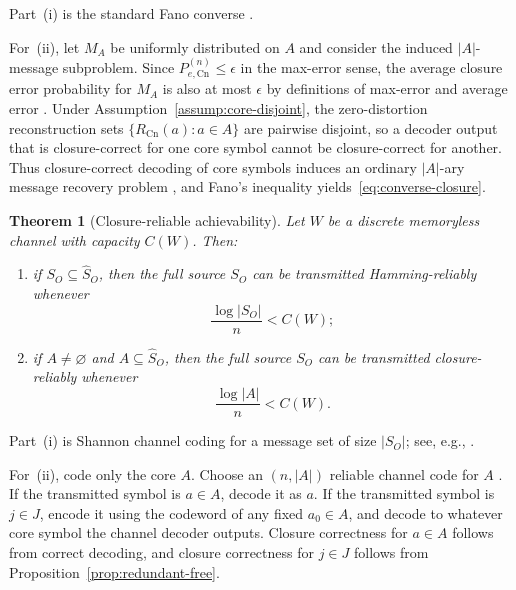 \documentclass[journal,onecolumn]{IEEEtran}
\makeatletter
\newcommand{\Cn}{\text{Cn}}
\newtheorem{theorem}{Theorem}[section]
\numberwithin{equation}{section}
\renewenvironment{proof}[1][\proofname]{\par
  \pushQED{\qed}%
  \normalfont \topsep6\p@\@plus6\p@\relax
  \trivlist
  \item[\hskip\labelsep
        \itshape
    #1\@addpunct{.}]\ignorespaces
}{%
  \popQED\endtrivlist\@endpefalse
}
\makeatother
\begin{document}
\begin{proof}
Part~\textup{(i)} is the standard Fano converse
\cite[Ch.~2]{cover2006elements}\cite[Ch.~3]{csiszar2011information}.

For~\textup{(ii)}, let \(M_A\) be uniformly distributed on \(A\) and
consider the induced \(|A|\)-message subproblem. Since
\(P_{e,\Cn}^{(n)}\le\epsilon\) in the max-error sense, the average
closure error probability for \(M_A\) is also at most \(\epsilon\)
by definitions of max-error and average error
\cite[Ch.~7]{cover2006elements}\cite[Ch.~6]{csiszar2011information}.
Under Assumption~\ref{assump:core-disjoint}, the zero-distortion
reconstruction sets \(\{R_{\Cn}(a):a\in A\}\) are pairwise disjoint,
so a decoder output that is closure-correct for one core symbol cannot
be closure-correct for another. Thus closure-correct decoding of core
symbols induces an ordinary \(|A|\)-ary message recovery problem
\cite[Ch.~7]{cover2006elements}\cite[Ch.~11]{csiszar2011information},
and Fano's inequality yields~\eqref{eq:converse-closure}.
\end{proof}

\begin{theorem}[Closure-reliable achievability]
\label{thm:achievability}
Let \(W\) be a discrete memoryless channel with capacity \(C(W)\).
Then:
\begin{enumerate}[label=\textup{(\roman*)}]
  \item if \(S_O\subseteq\hat S_O\), then the full source \(S_O\) can
        be transmitted Hamming-reliably whenever
        \[
          \frac{\log|S_O|}{n}<C(W);
        \]
  \item if \(A\neq\varnothing\) and \(A\subseteq\hat S_O\), then the
        full source \(S_O\) can be transmitted
        closure-reliably whenever
        \[
          \frac{\log|A|}{n}<C(W).
        \]
\end{enumerate}
\end{theorem}

\begin{proof}
Part~\textup{(i)} is Shannon channel coding for a message set of
size \(|S_O|\); see, e.g.,
\cite[Ch.~7]{cover2006elements}\cite[Ch.~6]{csiszar2011information}.

For~\textup{(ii)}, code only the core \(A\).
Choose an \((n,|A|)\) reliable channel code for \(A\)
\cite[Ch.~7]{cover2006elements}\cite[Ch.~6]{csiszar2011information}.
If the transmitted symbol is \(a\in A\), decode it as \(a\).
If the transmitted symbol is \(j\in J\), encode it using the
codeword of any fixed \(a_0\in A\), and decode to whatever core
symbol the channel decoder outputs.
Closure correctness for \(a\in A\) follows from correct decoding,
and closure correctness for \(j\in J\) follows from
Proposition~\ref{prop:redundant-free}.
\end{proof}
\end{document}
